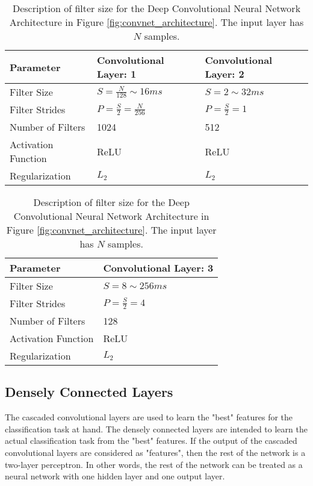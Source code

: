 \begin{table}[!th]
\centering
\def\arraystretch{2}\tabcolsep=10pt

\begin{subtable}{\textwidth}
\centering
\begin{tabular}{l | l | l}
\textbf{Parameter} & \textbf{Convolutional Layer: 1} & \textbf{Convolutional Layer: 2} \\
\hline
Filter Size & $S = \frac{N}{128} \sim 16 ms$ & $S = 2 \sim 32 ms$ \\
Filter Strides & $P = \frac{S}{2} = \frac{N}{256}$ & $P = \frac{S}{2} = 1$ \\
Number of Filters & 1024 & 512 \\
Activation Function & ReLU & ReLU \\
Regularization & $L_2$ & $L_2$ \\
\end{tabular}
\end{subtable}

\vspace{3cm}

\begin{subtable}{\textwidth}
\centering
\begin{tabular}{l | l}
\textbf{Parameter} & \textbf{Convolutional Layer: 3} \\
\hline
Filter Size & $S = 8 \sim 256 ms$ \\
Filter Strides & $P = \frac{S}{2} = 4$ \\
Number of Filters & 128 \\
Activation Function & ReLU \\
Regularization & $L_2$ \\
\end{tabular}
\end{subtable}

\caption{Description of filter size for the Deep Convolutional Neural Network Architecture in Figure \ref{fig:convnet_architecture}. The input layer has $N$ samples.}
\label{tab:conv_layer_list}
\end{table}

\subsection{Densely Connected Layers}

The cascaded convolutional layers are used to learn the "best" features for the classification task at hand.
 The densely connected layers are intended to learn the actual classification task from the "best" features.
 If the output of the cascaded convolutional layers are considered as "features", then the rest of the network is a two-layer perceptron.
 In other words, the rest of the network can be treated as a neural network with one hidden layer and one output layer.

